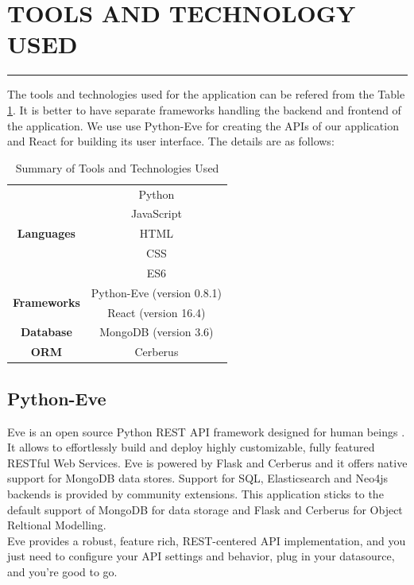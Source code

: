 \documentclass[a4paper,11pt]{article}
\begin{document}
\newpage
\section{TOOLS AND TECHNOLOGY USED}
\hrule
\vspace*{5mm}
The tools and technologies used for the application can be refered from the Table \ref{tab:tech}. It is better to have separate frameworks handling the backend and frontend of the application. We use use Python-Eve for creating the APIs of our application and React for building its user interface. The details are as follows:

\begin{table}[ht]
\centering
\caption{Summary of Tools and Technologies Used} 
\begin{tabular}{|c|c|} 
\hline
 \multirow{5}{*}{\textbf{Languages}}&Python\\&JavaScript\\&HTML\\&CSS\\&ES6\\
 \hline
 \multirow{2}{*}{\textbf{Frameworks}}&Python-Eve (version 0.8.1)\\& React (version 16.4) \\ 
 \hline
 \textbf{Database} & MongoDB (version 3.6) \\
\hline
 \textbf{ORM} & Cerberus\\
\hline
\end{tabular}
\label{tab:tech}
\end{table} 

\subsection{Python-Eve}
Eve is an open source Python REST API framework designed for human beings \cite{bworld}. It allows to effortlessly build and deploy highly customizable, fully featured RESTful Web Services. Eve is powered by Flask and Cerberus and it offers native support for MongoDB data stores. Support for SQL, Elasticsearch and Neo4js backends is provided by community extensions. This application sticks to the default support of MongoDB for data storage and Flask and Cerberus for Object Reltional Modelling.
\medskip\\
Eve provides a robust, feature rich, REST-centered API implementation, and you just need to configure your API settings and behavior, plug in your datasource, and you’re good to go. 
\end{document}
